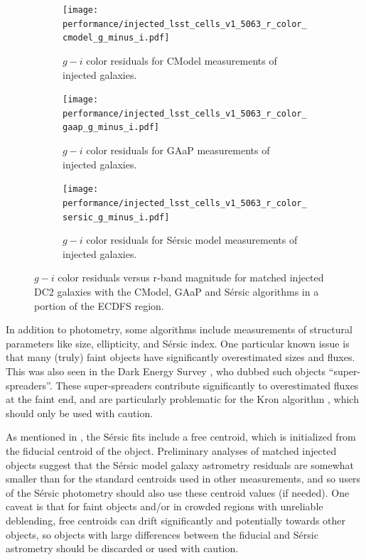 \begin{figure}[hbt!]
  \centering
  \begin{subfigure}[t]{0.31\textwidth}
\texttt{[image: performance/injected\_lsst\_cells\_v1\_5063\_r\_color\_cmodel\_g\_minus\_i.pdf]}
  \caption{$g-i$ color residuals for CModel measurements of injected galaxies.}
  \end{subfigure}\hfill
  \begin{subfigure}[t]{0.31\textwidth}
\texttt{[image: performance/injected\_lsst\_cells\_v1\_5063\_r\_color\_gaap\_g\_minus\_i.pdf]}
  \caption{$g-i$ color residuals for \gls{GAaP} measurements of injected galaxies.}
  \end{subfigure}\hfill
    \begin{subfigure}[t]{0.31\textwidth}
\texttt{[image: performance/injected\_lsst\_cells\_v1\_5063\_r\_color\_sersic\_g\_minus\_i.pdf]}
  \caption{$g-i$ color residuals for S\'ersic model measurements of injected galaxies.}
  \end{subfigure}\hfill
\caption{$g-i$ color residuals versus r-band magnitude for matched injected DC2 galaxies with the CModel, \gls{GAaP} and S\'ersic algorithms in a portion of the \gls{ECDFS} region.}
\label{fig:injected_lsst_cells_v1_5063_r_color_g_minus_i}
\vspace{0.1cm}
\end{figure}
In addition to photometry, some algorithms include measurements of structural parameters like size, ellipticity, and S\'ersic index.
One particular known issue is that many (truly) faint objects have significantly overestimated sizes and fluxes.
This was also seen in the Dark Energy Survey \citep{2025arXiv250105739B}, who dubbed such objects ``super-spreaders''.
These super-spreaders contribute significantly to overestimated fluxes at the faint end, and are particularly problematic for the Kron algorithm \citep{1980ApJS...43..305K}, which should only be used with caution.

As mentioned in , the S\'ersic fits include a free centroid, which is initialized from the fiducial centroid of the object.
Preliminary analyses of matched injected objects suggest that the S\'ersic model galaxy \gls{astrometry} residuals are somewhat smaller than for the standard centroids used in other measurements, and so users of the S\'ersic photometry should also use these centroid values (if needed).
One caveat is that for faint objects and/or in crowded regions with unreliable deblending, free centroids can drift significantly and potentially towards other objects, so objects with large differences between the fiducial and S\'ersic \gls{astrometry} should be discarded or used with caution.

